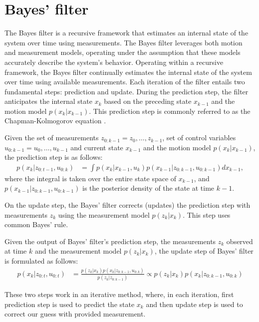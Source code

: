 \section{Bayes' filter}
The Bayes filter is a recursive framework that estimates an internal state of the system over time using measurements. The Bayes filter leverages both motion and measurement models, operating under the assumption that these models
accurately describe the system's behavior. Operating within a recursive framework, the Bayes filter continually
estimates the internal state of the system over time using available measurements. Each iteration of the filter
entails two fundamental steps: prediction and update. During the prediction step, the filter anticipates the internal
state $x_k$ based on the preceding state $x_{k-1}$ and the motion model $p(x_k|x_{k-1})$. This prediction step is
commonly referred to as the Chapman-Kolmogorov equation \cite{DedeciusSeq2017}.
\begin{theorem}
    Given the set of measurements $z_{0:k-1} = {z_0,\dots, z_{k-1}}$, set of control variables $u_{0:k-1} = {u_0,\dots, u_{k-1}}$ and current state $x_{k-1}$ and the motion model $p(x_k|x_{k-1})$, the prediction step is as follows:
    \begin{align}
        p(x_k|z_{0:t-1}, u_{0:k}) &= \int p(x_k|x_{k-1}, u_k) p(x_{k-1}|z_{0:k-1}, u_{0:k-1}) dx_{k-1},
        \label{eq:chapman_kolmogorov_predict}
    \end{align}
    where the integral is taken over the entire state space of $x_{k-1}$, and $p(x_{k-1}|z_{0:k-1}, u_{0:k-1})$ is
    the posterior density of the state at time $k-1$.
\end{theorem}
On the update step, the Bayes' filter corrects (updates) the prediction step with measurements $z_k$ using the
measurement model $p(z_k|x_k)$. This step uses common Bayes' rule.
\begin{theorem}
    Given the output of Bayes' filter's prediction step, the measurements $z_k$ observed at time $k$ and the
    measurement model $p(z_k|x_k)$, the update step of Bayes' filter is formulated as follows:
    \begin{align}
        \label{eq:bayes_update}
        p(x_k|z_{0:t}, u_{0:t}) &= \frac{p(z_k|x_k) p(x_k|z_{0:k-1},u_{0:k})}{p(z_k|z_{0:k-1})} \propto p(z_k|x_k) p
        (x_k|z_{0:k-1},u_{0:k})
    \end{align}
\end{theorem}
These two steps work in an iterative method, where, in each iteration, first prediction step is used to predict
the state $x_k$ and then update step is used to correct our guess with provided measurement.

